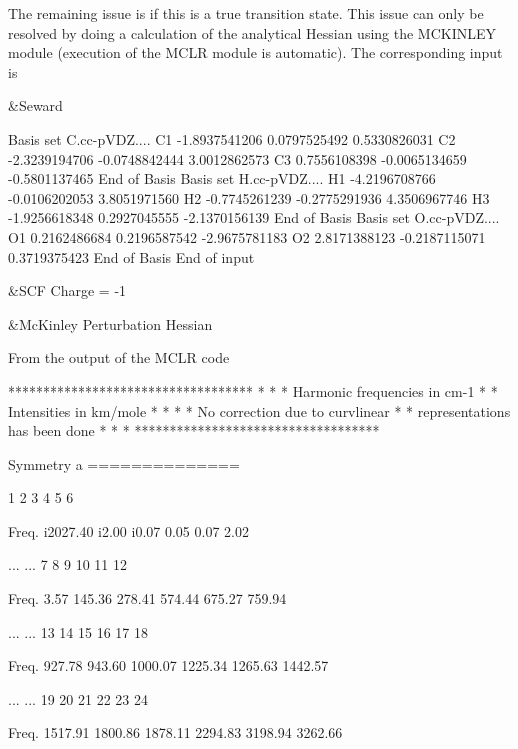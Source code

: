 The remaining issue is if this is a true transition state. This issue can only be 
resolved by doing a calculation of the analytical Hessian using the
MCKINLEY module (execution of the MCLR module is automatic). The corresponding input is

\begin{inputlisting}
 &Seward

Basis set
C.cc-pVDZ....
C1            -1.8937541206        0.0797525492        0.5330826031
C2            -2.3239194706       -0.0748842444        3.0012862573
C3             0.7556108398       -0.0065134659       -0.5801137465
End of Basis
Basis set
H.cc-pVDZ....
H1            -4.2196708766       -0.0106202053        3.8051971560
H2            -0.7745261239       -0.2775291936        4.3506967746
H3            -1.9256618348        0.2927045555       -2.1370156139
End of Basis
Basis set
O.cc-pVDZ....
O1             0.2162486684        0.2196587542       -2.9675781183
O2             2.8171388123       -0.2187115071        0.3719375423
End of Basis
End of input

 &SCF
Charge = -1

 &McKinley
Perturbation
Hessian
\end{inputlisting}

From the output of the MCLR code

\begin{sourcelisting}

      ***********************************
      *                                 *
      * Harmonic frequencies in cm-1    *
      * Intensities in km/mole          *
      *                                 *
      * No correction due to curvlinear *
      * representations has been done   *
      *                                 *
      ***********************************

    Symmetry a
   ==============

                         1         2         3         4         5         6

            Freq.   i2027.40     i2.00     i0.07      0.05      0.07      2.02

...
...
                         7         8         9        10        11        12

            Freq.       3.57    145.36    278.41    574.44    675.27    759.94

...
...
                        13        14        15        16        17        18

            Freq.     927.78    943.60   1000.07   1225.34   1265.63   1442.57

...
...
                       19        20        21        22        23        24

            Freq.    1517.91   1800.86   1878.11   2294.83   3198.94   3262.66

\end{sourcelisting}

